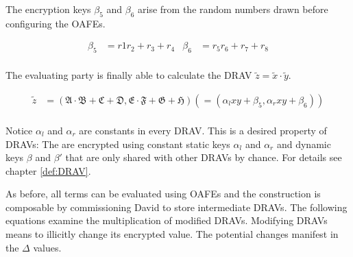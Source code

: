 \noindent{}The encryption keys $\beta_5$ and $\beta_6$ arise from the random
numbers drawn before configuring the OAFEs.

\begin{align*}
  \beta_5 & = r1r_2 + r_3 + r_4 &
  \beta_6 & = r_5r_6 + r_7 + r_8 \\
\end{align*}

\noindent{}The evaluating party is finally able to calculate the DRAV
$\widetilde{z} = \widetilde{x} \cdot \widetilde{y}$.

\begin{align*}
  \widetilde{z} & = (\mathfrak{A} \cdot \mathfrak{B}+\mathfrak{C}+\mathfrak{D}
                    ,\mathfrak{E} \cdot \mathfrak{F}+\mathfrak{G}+\mathfrak{H})
                    (= (\alpha_l xy + \beta_5, \alpha_r xy + \beta_6)) \\
\end{align*}

Notice $\alpha_l$ and $\alpha_r$ are constants in every DRAV. This is a desired
property of DRAVs: The are encrypted using constant static keys $\alpha_l$ and
$\alpha_r$ and dynamic keys $\beta$ and $\beta'$ that are only shared with other
DRAVs by chance. For details see chapter \ref{def:DRAV}.

As before, all terms can be evaluated using OAFEs and the construction is
composable by commissioning David to store intermediate DRAVs. The following
equations examine the multiplication of modified DRAVs. Modifying DRAVs means to
illicitly change its encrypted value. The potential changes manifest in the
$\Delta$ values.

